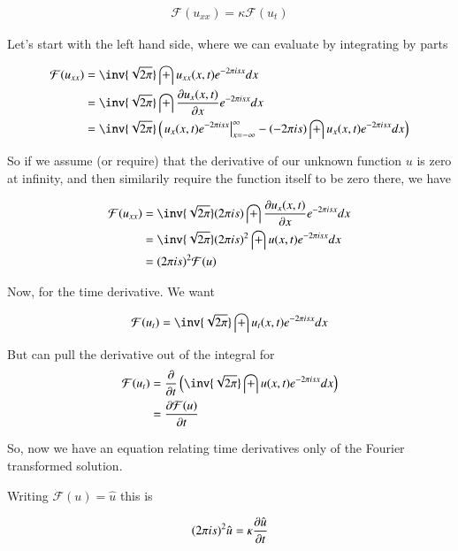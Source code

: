 \documentclass{article}
\newcommand{\FF}[0]{\mathcal{F}}
\begin{document}
\begin{align*}
\FF(u_{xx}) = \kappa \FF(u_t)
\end{align*}

Let's start with the left hand side, where we can evaluate by integrating by parts

\begin{align*}
\FF(u_{xx}) 
&= \inv{\sqrt{2\pi}} \int u_{xx}(x, t) e^{- 2 \pi i s x } dx \\
&= \inv{\sqrt{2\pi}} \int \PD{x}{u_x(x, t)} e^{- 2 \pi i s x } dx \\
&= \inv{\sqrt{2\pi}} 
\left(
{\left. u_x(x, t) e^{- 2 \pi i s x } \right\vert}_{x= -\infty}^\infty
-( - 2 \pi i s ) \int u_x(x, t) e^{- 2 \pi i s x } dx 
\right) \\
\end{align*}

So if we assume (or require) that the derivative of our unknown function $u$ is zero at infinity, and then similarily
require the function itself to be zero there, we have

\begin{align*}
\FF(u_{xx}) 
&= \inv{\sqrt{2\pi}} ( 2 \pi i s ) \int \PD{x}{u_x(x, t)} e^{- 2 \pi i s x } dx  \\
&= \inv{\sqrt{2\pi}} ( 2 \pi i s )^2 \int u(x, t) e^{- 2 \pi i s x } dx  \\
&= ( 2 \pi i s )^2 \FF(u)
\end{align*}

Now, for the time derivative.  We want

\begin{align*}
\FF(u_t) &= \inv{\sqrt{2\pi}} \int u_t(x, t) e^{- 2 \pi i s x } dx \\
\end{align*}

But can pull the derivative out of the integral for
\begin{align*}
\FF(u_t)
&= \PD{t}{} \left(\inv{\sqrt{2\pi}} \int u(x, t) e^{- 2 \pi i s x } dx \right) \\
&= \PD{t}{\FF(u)} 
\end{align*}

So, now we have an equation relating time derivatives only of the Fourier transformed solution.

Writing $\FF(u) = \hat{u}$ this is

\begin{align}\label{eqn:toSolveFreq}
( 2 \pi i s )^2 \hat{u} = \kappa \PD{t}{\hat{u}}
\end{align}
\end{document}
